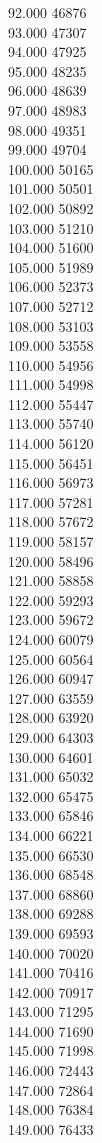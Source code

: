 { 92.000	46876 \\
 93.000	47307 \\
 94.000	47925 \\
 95.000	48235 \\
 96.000	48639 \\
 97.000	48983 \\
 98.000	49351 \\
 99.000	49704 \\
 100.000	50165 \\
 101.000	50501 \\
 102.000	50892 \\
 103.000	51210 \\
 104.000	51600 \\
 105.000	51989 \\
 106.000	52373 \\
 107.000	52712 \\
 108.000	53103 \\
 109.000	53558 \\
 110.000	54956 \\
 111.000	54998 \\
 112.000	55447 \\
 113.000	55740 \\
 114.000	56120 \\
 115.000	56451 \\
 116.000	56973 \\
 117.000	57281 \\
 118.000	57672 \\
 119.000	58157 \\
 120.000	58496 \\
 121.000	58858 \\
 122.000	59293 \\
 123.000	59672 \\
 124.000	60079 \\
 125.000	60564 \\
 126.000	60947 \\
 127.000	63559 \\
 128.000	63920 \\
 129.000	64303 \\
 130.000	64601 \\
 131.000	65032 \\
 132.000	65475 \\
 133.000	65846 \\
 134.000	66221 \\
 135.000	66530 \\
 136.000	68548 \\
 137.000	68860 \\
 138.000	69288 \\
 139.000	69593 \\
 140.000	70020 \\
 141.000	70416 \\
 142.000	70917 \\
 143.000	71295 \\
 144.000	71690 \\
 145.000	71998 \\
 146.000	72443 \\
 147.000	72864 \\
 148.000	76384 \\
 149.000	76433 \\
}
